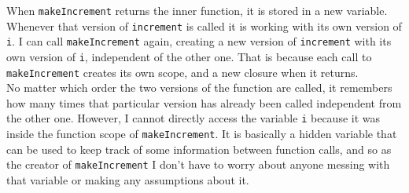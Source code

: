 When \texttt{makeIncrement} returns the inner function, it is stored in a new variable. Whenever that version of \texttt{increment} is called it is working with its own version of \texttt{i}. I can call \texttt{makeIncrement} again, creating a new version of \texttt{increment} with its own version of \texttt{i}, independent of the other one. That is because each call to \texttt{makeIncrement} creates its own scope, and a new closure when it returns.\\

No matter which order the two versions of the function are called, it remembers how many times that particular version has already been called independent from the other one. However, I cannot directly access the variable \texttt{i} because it was inside the function scope of \texttt{makeIncrement}. It is basically a hidden variable that can be used to keep track of some information between function calls, and so as the creator of \texttt{makeIncrement} I don't have to worry about anyone messing with that variable or making any assumptions about it.\\